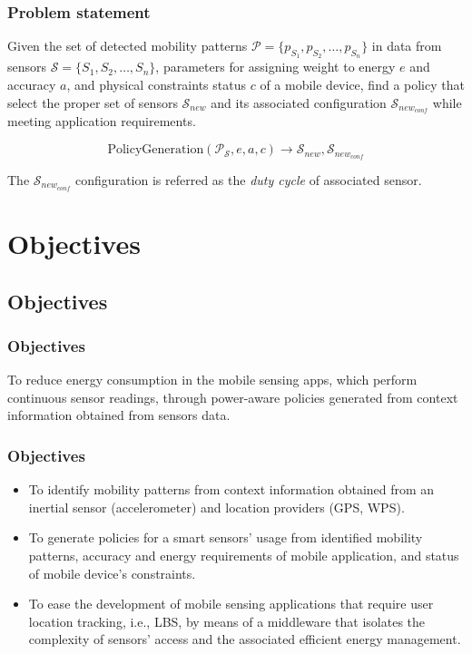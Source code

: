 \documentclass[compress,9pt,xcolor={dvipsnames,table}]{beamer}
\begin{document}
\begin{frame}\frametitle{Problem statement}
\begin{tcolorbox}[title=Problem statement: Policy generation,colframe=PineGreen]
\small
Given the set of detected mobility patterns $\mathcal{P} = \{ p_{S_1}, p_{S_2}, \ldots, p_{S_n} \}$ in data from sensors $\mathcal{S} = \{ S_1,S_2,\ldots, S_n \}$, parameters for assigning weight to energy $e$ and accuracy $a$, and physical constraints status $c$ of a mobile device, find a policy that select the proper set of sensors $\mathcal{S}_{new}$ and its associated configuration $\mathcal{S}_{new_{conf}}$  while meeting application requirements.

\begin{equation}
  \text{PolicyGeneration}( \mathcal{P}_{\mathcal{S}}, e, a, c ) \longrightarrow{} \mathcal{S}_{new}, \mathcal{S}_{new_{conf}}
\end{equation}

The $\mathcal{S}_{new_{conf}}$ configuration is referred as the \emph{duty cycle} of associated sensor.
\end{tcolorbox}
\end{frame}

\section{Objectives}
\subsection{Objectives}
\begin{frame}\frametitle{Objectives}
\begin{tcolorbox}[title=Main objective,colframe=PineGreen]
To reduce energy consumption in the mobile sensing apps, which perform continuous sensor readings, through power-aware policies generated from context information obtained from sensors data.
\end{tcolorbox}
\end{frame}

\begin{frame}\frametitle{Objectives}
\begin{tcolorbox}[title=Particular objectives,colframe=PineGreen]
\small
\begin{itemize}
  \item To identify mobility patterns from context information obtained from an inertial sensor (accelerometer) and location providers (GPS, WPS).
  \item To generate policies for a smart sensors' usage from identified mobility patterns, accuracy and energy requirements of mobile application, and status of mobile device's constraints. 
  \item To ease the development of mobile sensing applications that require user location tracking, i.e., LBS, by means of a middleware that isolates the complexity of sensors' access and the associated efficient energy management.
\end{itemize}
\end{tcolorbox}
\end{frame}
\end{document}
